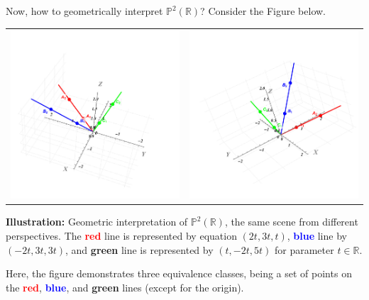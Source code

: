 \documentclass[../lecture-notes.tex]{subfiles}
\begin{document}
\begin{example}
    Now, how to geometrically interpret $\mathbb{P}^2(\mathbb{R})$? Consider the Figure below.

    \begin{center}
        \begin{tabular}{cc}
            \centering\includegraphics[trim={100 100 100 200}, width=0.45\linewidth, clip]{images/lecture_4/line_1_view_1.pdf} &
            \centering\includegraphics[trim={100 100 100 200}, width=0.45\linewidth, clip]{images/lecture_4/line_1_view_2.pdf}
        \end{tabular}
        \scriptsize{\textbf{Illustration:} Geometric interpretation of $\mathbb{P}^2(\mathbb{R})$, the same scene from different perspectives. The \textcolor{red}{\textbf{red}} line is represented by equation $(2t,3t,t)$, \textcolor{blue}{\textbf{blue}} line by $(-2t,3t,3t)$, and \textcolor{green!60!black}{\textbf{green}} line is represented by $(t,-2t,5t)$ for parameter $t \in \mathbb{R}$.}
    \end{center}

    Here, the figure demonstrates three equivalence classes, being a set of points on the \textcolor{red}{\textbf{red}}, \textcolor{blue}{\textbf{blue}}, and \textcolor{green!60!black}{\textbf{green}} lines (except for the origin). 
    

\end{example}
\end{document}
